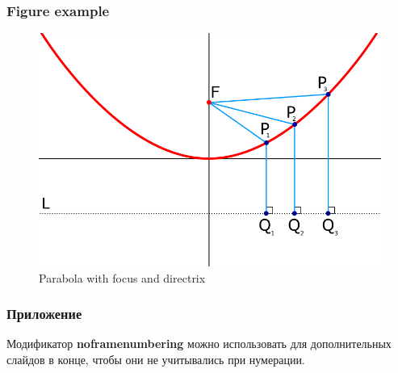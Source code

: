 \documentclass[aspectratio=169]{beamer}
\begin{document}
\begin{frame}
\frametitle{Figure example}
\begin{figure}
    \includegraphics[scale=.3]{fig/parabola.png}
    \caption{Parabola with focus and directrix}
\end{figure}
\end{frame}


\begin{frame}[plain]
\end{frame}

\begin{frame}[noframenumbering]
\frametitle{Приложение}
    \large
    Модификатор \textbf{noframenumbering} можно использовать для дополнительных слайдов в конце, чтобы они не учитывались при нумерации.
\end{frame}
\end{document}
